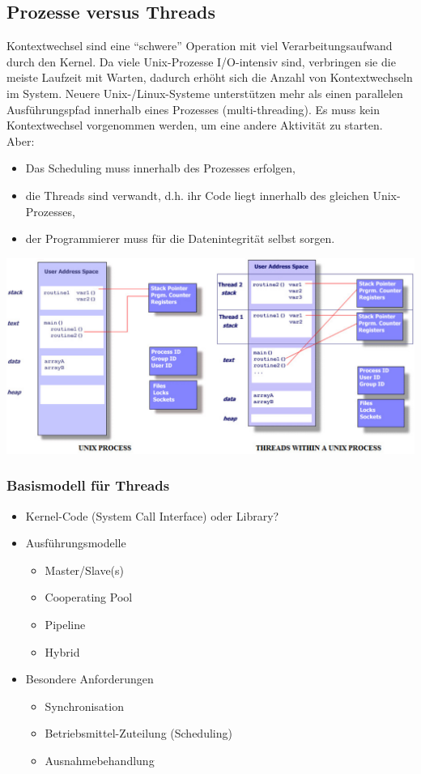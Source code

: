 \documentclass[a4paper, 10pt]{article}
\begin{document}
\subsection{Prozesse versus Threads}
Kontextwechsel sind eine “schwere” Operation mit viel Verarbeitungsaufwand durch den Kernel. Da viele Unix-Prozesse I/O-intensiv sind, verbringen sie die meiste Laufzeit mit Warten, dadurch erhöht sich die Anzahl von Kontextwechseln im System. Neuere Unix-/Linux-Systeme unterstützen mehr als einen parallelen Ausführungspfad innerhalb eines Prozesses (multi-threading). Es muss kein Kontextwechsel vorgenommen werden, um eine andere Aktivität zu starten. \\
Aber:
\begin{itemize}
	\item Das Scheduling muss innerhalb des Prozesses erfolgen,
	\item die Threads sind verwandt, d.h. ihr Code liegt innerhalb des gleichen Unix-Prozesses,
	\item der Programmierer muss für die Datenintegrität selbst sorgen.
\end{itemize}
\includegraphics[scale=0.3]{process_vs_threads.png}

\subsubsection{Basismodell für Threads}
\begin{itemize}
	\item Kernel-Code (System Call Interface) oder Library?
	\item Ausführungsmodelle
		\begin{itemize}
			\item Master/Slave(s)
			\item Cooperating Pool
			\item Pipeline
			\item Hybrid
		\end{itemize}
	\item Besondere Anforderungen
		\begin{itemize}
			\item Synchronisation
			\item Betriebsmittel-Zuteilung (Scheduling)
			\item Ausnahmebehandlung
		\end{itemize}
\end{itemize}
\end{document}
